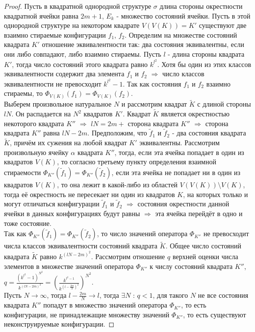 \documentclass[a4paper, 12pt]{article}
\theoremstyle{definition}
\theoremstyle{plain}
\theoremstyle{remark}
\begin{document}
  \begin{proof}
    Пусть в квадратной однородной структуре $\sigma$ длина стороны окрестности квадратной ячейки равна $2m+1$, $E_k$ - множество состояний ячейки. Пусть в этой однородной структуре на некотором квадрате $V(V(K))=K'$ существуют две взаимно стираемые конфигурации $f_1$, $f_2$. Определим на множестве состояний квадрата $K'$ отношение эквивалентности так: два состояния эквивалентны, если они либо совпадают, либо взаимно стираемы. Пусть $l$ - длина стороны квадрата $K'$, тогда число состояний этого квадрата равно $k^{l^2}$. Хотя бы один из этих классов эквивалентности содержит два элемента $f_1$ и $f_2$ $\Longrightarrow$ число классов эквивалентности не превосходит $k^{l^2}-1$. Так как состояния $f_1$ и $f_2$ взаимно стираемы, то $\Phi_{V(K)}(f_1)=\Phi_{V(K)}(f_2)$.\\
    Выберем произвольное натуральное $N$ и рассмотрим квадрат $\tilde{K}$ с длиной стороны $lN$. Он распадается на $N^2$ квадратов $K'$. Квадрат $\tilde{K}$ является окрестностью некоторого квадрата $K''$ $\Longrightarrow$ $lN=2m+$ сторона квадрата $K''$ $\Longrightarrow$ сторона квадрата $K''$ равна $lN-2m$. Предположим, что $\tilde{f}_1$ и $\tilde{f}_2$ - два состояния квадрата $\tilde{K}$, причём их сужения на любой квадрат $K'$ эквивалентны. Рассмотрим произвольную ячейку $\alpha$ квадрата $K''$, тогда, если эта ячейка попадает в один из квадратов $V(K)$, то согласно третьему пункту определения взаимной стираемости $\Phi_{K''}(\tilde{f}_1)=\Phi_{K''}(\tilde{f}_2)$, если эта ячейка не попадает ни в один из квадратов $V(K)$, то она лежит в какой-либо из областей $V(V(K))\setminus  V(K)$, тогда её окрестность не пересекает ни один из квадратов $K$, на которых только и могут отличаться конфигурации $\tilde{f}_1$ и $\tilde{f}_2$ $\Longrightarrow$ состояния окрестности данной ячейки в данных конфигурациях будут равны $\Longrightarrow$ эта ячейка перейдёт в одно и тоже состояние.\\
    Так как $\Phi_{K''}(\tilde{f}_1)=\Phi_{K''}(\tilde{f}_2)$, то число значений оператора $\Phi_{K''}$ не превосходит числа классов эквивалентности состояний квадрата $\tilde{K}$. Общее число состояний квадрата $\tilde{K}$ равно $k^{(lN-2m)^2}$. Рассмотрим отношение $q$ верхней оценки числа элементов в множестве значений оператора $\Phi_{K''}$ к числу состояний квадрата $K''$, $q=\frac{(k^{l^2}-1)^{N^2}}{k^{(lN-2m)^2}}=(\frac{k^{l^2-1}}{k^{(l-\frac{2m}{N})^2}})^{N^2}$.\\
    Пусть $N\rightarrow\infty$, тогда $l-\frac{2m}{N}\rightarrow l$, тогда $\exists N$ : $q<1$, для такого $N$ не все состояния квадрата $K''$ попадут в множество значений оператора $\Phi_{K''}$, то есть конфигурации, не принадлежащие множеству значений $\Phi_{K''}$, то есть существуют неконструируемые конфигурации.
  \end{proof}
\end{document}
